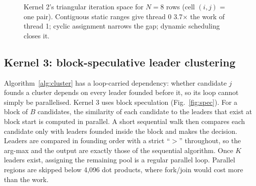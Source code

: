 \documentclass[conference,a4paper]{IEEEtran}
\begin{document}
\begin{figure}[!t]
\centering
{}
\caption{Kernel 2's triangular iteration space for $N=8$ rows (cell $(i,j)$ = one pair). Contiguous static ranges
give thread 0 3.7$\times$ the work of thread 1; cyclic assignment narrows the gap; dynamic scheduling closes it.}
\label{fig:tri}
\end{figure}

\subsection{Kernel 3: block-speculative leader clustering}
Algorithm~\ref{alg:cluster} has a loop-carried dependency: whether candidate $j$ founds a cluster depends on every
leader founded before it, so its loop cannot simply be parallelised. Kernel 3 uses block speculation
(Fig.~\ref{fig:spec}). For a block of $B$ candidates, the similarity of each candidate to the leaders that exist at
block start is computed in parallel. A short sequential walk then compares each candidate only with leaders founded
inside the block and makes the decision. Leaders are compared in founding order with a strict ``$>$'' throughout, so
the arg-max and the output are exactly those of the sequential algorithm. Once $K$ leaders exist, assigning the
remaining pool is a regular parallel loop. Parallel regions are skipped below 4,096 dot products, where fork/join
would cost more than the work.
\end{document}
